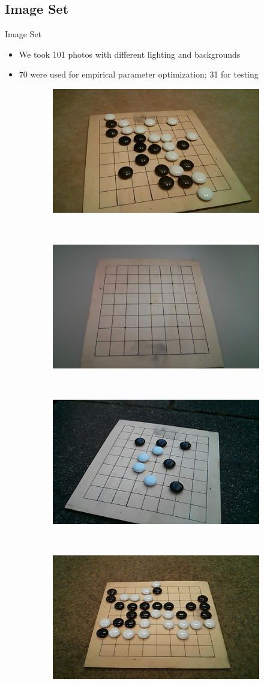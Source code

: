 \documentclass[table]{beamer}
\begin{document}
\subsection{Image Set}
\begin{frame}{Image Set}
	\begin{itemize}
		\item We took 101 photos with different lighting and backgrounds
		\item 70 were used for empirical parameter optimization; 31 for testing
	\end{itemize}

	\begin{figure}
		\begin{subfigure}{}
			\includegraphics[width=0.3\columnwidth]{images/warmLight_many_leftMedium.png}
		\end{subfigure}
		~
		\begin{subfigure}{}
				\includegraphics[width=0.3\columnwidth]{images/neonDesk_empty_centerAbove.png}
		\end{subfigure}
		~
		\begin{subfigure}{}
				\includegraphics[width=0.3\columnwidth]{images/shadowStone_some_rightAbove.png}
		\end{subfigure}
		\\
		\begin{subfigure}{}
				\includegraphics[width=0.3\columnwidth]{images/neonFloor_many_centerLow.png}

\end{subfigure}
\end{figure}
\end{frame}
\end{document}
